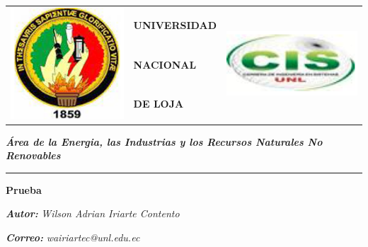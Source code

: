 \documentclass[a4paper,openright,12pt]{report}
\begin{document}


\pagestyle{fancy}
\renewcommand{\headrulewidth}{0pt}
\bigskip
\bigskip

{\setlength{\arrayrulewidth}{0.5mm}
\begin{tabular}{p{2 cm} | p{10
cm} p{3 cm}}
\multirow{3}{2cm}{\Large{\includegraphics[width=1.9 cm]{unloja}}} 
&\Large{\textbf{UNIVERSIDAD}}&\multirow{3}{2cm}{\Large{\includegraphics[width=3 cm]{logo13}}}\\

& \Large{\textbf{NACIONAL}}& \\
& \Large{\textbf{DE LOJA}}&\\

\end{tabular}
\bigskip
\bigskip

\begin{flushleft}

\raggedright{ 
\normalsize{\textit{\textbf{Área de la Energia, las Industrias y los Recursos Naturales No Renovables}}}
}
\thinspace
\rule{1\textwidth}{0.04cm} 
\thinspace
{}
\end{flushleft}
\bigskip
\bigskip
\bigskip
\bigskip
\bigskip
\center
\begin{Huge}
\textbf {Prueba}
\end{Huge}
\bigskip
\bigskip
\bigskip
\bigskip

\bigskip
\begin{flushleft}
\textit{\textbf{Autor:}}
\textit{Wilson Adrian Iriarte Contento}
\begin{itemize}
\renewcommand{\labelitemi}{$\diamond$} 
\end{itemize}
\bigskip
\bigskip
\bigskip

\end{flushleft}
\thinspace
\bigskip

\begin{flushleft}
\textit{\textbf{Correo:}}
\textit{wairiartec@unl.edu.ec}
\end{flushleft}
\thinspace
\bigskip
\bigskip
\bigskip

}
\end{document}
